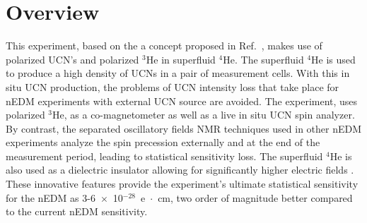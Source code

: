 \section{Overview}

This experiment, based on the a concept proposed in Ref.~\cite{Golub1994}, makes use of polarized UCN's and polarized $^3$He in superfluid $^4$He. The superfluid $^4$He is used to produce a high density of UCNs in a pair of measurement cells. With this in situ UCN production, the problems of UCN intensity loss that take place for nEDM experiments with external UCN source are avoided. The experiment, uses polarized $^3$He, as a co-magnetometer as well as a live in situ UCN spin analyzer. By contrast, the separated oscillatory fields NMR techniques used in other nEDM experiments analyze the spin precession externally and at the end of the measurement period, leading to statistical sensitivity loss. The superfluid $^4$He is also used as a dielectric insulator allowing for significantly higher electric fields \cite{Ito2016}. These innovative features provide the experiment's ultimate statistical sensitivity for the nEDM as 3-6~$\times$~10$^{-28}$~e~$\cdot$~cm, two order of magnitude better compared to the current nEDM sensitivity.



